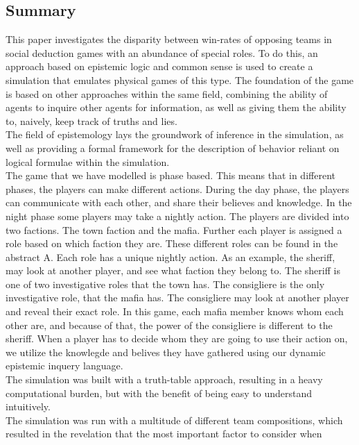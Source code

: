 \onecolumn
\begin{center}
	\section*{Summary}\label{sec:summary}
\end{center}
This paper investigates the disparity between win-rates of opposing teams in
social deduction games with an abundance of special roles. To do  this, an
approach based on epistemic logic and common sense is used to create a
simulation that emulates physical games of this type. The foundation of the
game is based on other approaches within the same field, combining the ability
of agents to inquire other agents for information, as well as giving them the
ability to, naively, keep track of truths and lies. \\
The field of epistemology lays the groundwork of inference in the simulation,
as well as providing a formal framework for the description of behavior
reliant on logical formulae within the simulation. \\
The game that we have modelled is phase based. This means that in different phases, the players can make different actions. During the day phase, the players can communicate with each other, and share their believes and knowledge. In the night phase some players may take a nightly action. The players are divided into two factions. The town faction and the mafia. Further each player is assigned a role based on which faction they are. These different roles can be found in the abstract A. Each role has a unique nightly action. As an example, the sheriff, may look at another player, and see what faction they belong to. The sheriff is one of two investigative roles that the town has. The consigliere is the only investigative role, that the mafia has. The consigliere may look at another player and reveal their exact role. In this game, each mafia member knows whom each other are, and because of that, the power of the consigliere is different to the sheriff.
When a player has to decide whom they are going to use their action on, we utilize the knowlegde and belives they have gathered using our dynamic epistemic inquery language. \\
The simulation was built with a truth-table approach, resulting in a heavy
computational burden, but with the benefit of being easy to understand
intuitively. \\
The simulation was run with a multitude of different team compositions, which
resulted in the revelation that the most important factor to consider when
